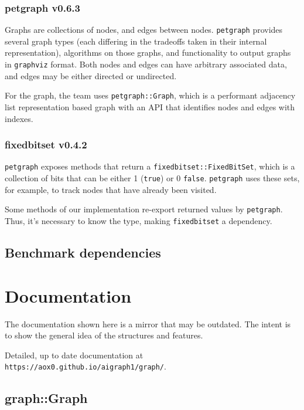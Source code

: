 \subsubsection{petgraph v0.6.3}

Graphs are collections of nodes, and edges between nodes. \texttt{petgraph} provides several graph types 
(each differing in the tradeoffs taken in their internal representation), algorithms on those graphs, 
and functionality to output graphs in \texttt{graphviz} format. Both nodes and edges can have arbitrary associated data, 
and edges may be either directed or undirected. \autocite{petgraph}

For the graph, the team uses \texttt{petgraph::Graph}, which is a performant adjacency list representation based graph
with an API that identifies nodes and edges with indexes.

\subsubsection{fixedbitset v0.4.2}

\texttt{petgraph} exposes methods that return a \texttt{fixedbitset::FixedBitSet}, which is a collection of bits that can be either 1 (\texttt{true})
or 0 \texttt{false}. \texttt{petgraph} uses these sets, for example, to track nodes that have already been visited.

Some methods of our implementation re-export returned values by \texttt{petgraph}. Thus, it's necessary to know the type, making
\texttt{fixedbitset} a dependency. \autocite{fixedbitset}

\subsection{Benchmark dependencies}

\newpage
\section{Documentation}

The documentation shown here is a mirror that may be outdated. 
The intent is to show the general idea of the structures and features.

Detailed, up to date documentation at \texttt{https://aox0.github.io/aigraph1/graph/}.

\subsection{graph::Graph}

